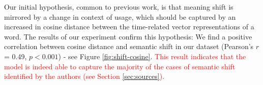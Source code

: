 

Our initial hypothesis, common to previous work, is that meaning shift
is mirrored by a change in context of usage, which should be captured
by an increased in cosine distance between the time-related vector
representations of a word. The results of our experiment confirm this
hypothesis: We find a positive correlation between cosine distance and
semantic shift in our dataset (Pearson's $r$= 0.49, $p<0.001$) - see 
Figure \ref{fig:shift-cosine}. \textcolor{red}{This result indicates that the model is indeed able to capture the majority of the cases of semantic shift identified by the authors (see Section \ref{sec:sources}).}

